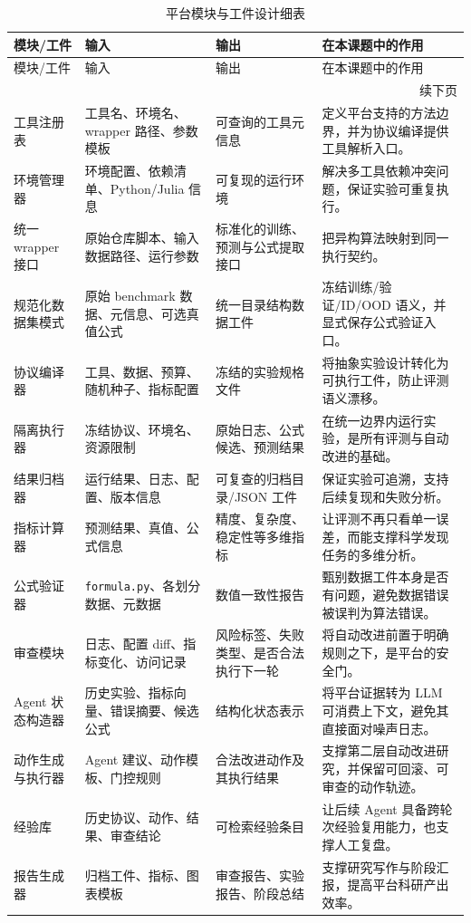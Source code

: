 \documentclass[UTF8,12pt]{ctexart}
\begin{document}
\small
\begin{longtable}{p{2.7cm}p{3.7cm}p{3.7cm}p{4.2cm}}
\caption{平台模块与工件设计细表}\label{tab:module-design}\\
\toprule
模块/工件 & 输入 & 输出 & 在本课题中的作用 \\
\midrule
\endfirsthead
\toprule
模块/工件 & 输入 & 输出 & 在本课题中的作用 \\
\midrule
\endhead
\midrule
\multicolumn{4}{r}{续下页}\\
\endfoot
\bottomrule
\endlastfoot
工具注册表 & 工具名、环境名、wrapper 路径、参数模板 & 可查询的工具元信息 & 定义平台支持的方法边界，并为协议编译提供工具解析入口。 \\
环境管理器 & 环境配置、依赖清单、Python/Julia 信息 & 可复现的运行环境 & 解决多工具依赖冲突问题，保证实验可重复执行。 \\
统一 wrapper 接口 & 原始仓库脚本、输入数据路径、运行参数 & 标准化的训练、预测与公式提取接口 & 把异构算法映射到同一执行契约。 \\
规范化数据集模式 & 原始 benchmark 数据、元信息、可选真值公式 & 统一目录结构数据工件 & 冻结训练/验证/ID/OOD 语义，并显式保存公式验证入口。 \\
协议编译器 & 工具、数据、预算、随机种子、指标配置 & 冻结的实验规格文件 & 将抽象实验设计转化为可执行工件，防止评测语义漂移。 \\
隔离执行器 & 冻结协议、环境名、资源限制 & 原始日志、公式候选、预测结果 & 在统一边界内运行实验，是所有评测与自动改进的基础。 \\
结果归档器 & 运行结果、日志、配置、版本信息 & 可复查的归档目录/JSON 工件 & 保证实验可追溯，支持后续复现和失败分析。 \\
指标计算器 & 预测结果、真值、公式信息 & 精度、复杂度、稳定性等多维指标 & 让评测不再只看单一误差，而能支撑科学发现任务的多维分析。 \\
公式验证器 & \texttt{formula.py}、各划分数据、元数据 & 数值一致性报告 & 甄别数据工件本身是否有问题，避免数据错误被误判为算法错误。 \\
审查模块 & 日志、配置 diff、指标变化、访问记录 & 风险标签、失败类型、是否合法执行下一轮 & 将自动改进前置于明确规则之下，是平台的安全门。 \\
Agent 状态构造器 & 历史实验、指标向量、错误摘要、候选公式 & 结构化状态表示 & 将平台证据转为 LLM 可消费上下文，避免其直接面对噪声日志。 \\
动作生成与执行器 & Agent 建议、动作模板、门控规则 & 合法改进动作及其执行结果 & 支撑第二层自动改进研究，并保留可回滚、可审查的动作轨迹。 \\
经验库 & 历史协议、动作、结果、审查结论 & 可检索经验条目 & 让后续 Agent 具备跨轮次经验复用能力，也支撑人工复盘。 \\
报告生成器 & 归档工件、指标、图表模板 & 审查报告、实验报告、阶段总结 & 支撑研究写作与阶段汇报，提高平台科研产出效率。 \\
\end{longtable}
\normalsize
\end{document}
